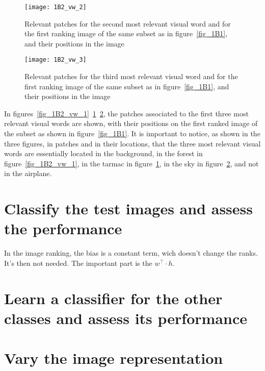 \documentclass{article}
\begin{document}
\begin{figure}[ht!]
	\centering
	\texttt{[image: 1B2\_vw\_2]}
	\caption{Relevant patches for the second most relevant visual word and for the first ranking image of the same subset as in figure~\ref{fig_1B1}, and their positions in the image}
	\label{fig_1B2_vw_2}
\end{figure}

\begin{figure}[ht!]
	\centering
	\texttt{[image: 1B2\_vw\_3]}
	\caption{Relevant patches for the third most relevant visual word and for the first ranking image of the same subset as in figure~\ref{fig_1B1}, and their positions in the image}
	\label{fig_1B2_vw_3}
\end{figure}

In figures~\ref{fig_1B2_vw_1}~\ref{fig_1B2_vw_2}~\ref{fig_1B2_vw_3}, the patches associated to the first three most relevant visual words are shown, with their positions on the first ranked image of the subset as shown in figure~\ref{fig_1B1}. It is important to notice, as shown in the three figures, in patches and in their locations, that the three most relevant visual words are essentially located in the background, in the forest in figure~\ref{fig_1B2_vw_1}, in the tarmac in figure~\ref{fig_1B2_vw_2}, in the sky in figure~\ref{fig_1B2_vw_3}, and not in the airplane.

\clearpage

\section{Classify the test images and assess the performance}


In the image ranking, the bias is a constant term, wich doesn't change the ranks. It's then not needed. The important part is the \( w^{\intercal} \cdot h\).

\section{Learn a classifier for the other classes and assess its performance}

\section{Vary the image representation}
\end{document}
